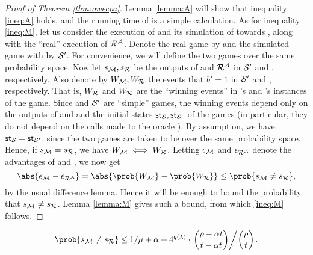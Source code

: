 \begin{proof}[Proof of Theorem \ref{thm:owecpa}]
  Lemma \ref{lemma:A} will show that inequality \eqref{ineq:A} holds,
  and the running time of \redM is a simple calculation.
  As for inequality \eqref{ineq:M}, let us consider the execution of \redM
  and its simulation of \advA towards \redR,
  along with the ``real'' execution of \(\redR^{\advA}\).
  Denote the real game by \Simple and the simulated game with \redM by \(\mathcal{S}'\).
  For convenience, we will define the two games over the same probability space.
  Now let \(s_{\redM}, s_{\redR}\) be the outputs of \redM and \(\redR^{\advA}\) in \(\mathcal{S}'\) and \Simple, respectively.
  Also denote by \(W_{\redM}, W_{\redR}\) the events that \(b' = 1\) in \(\mathcal{S}'\) and \Simple, respectively.
  That is, \(W_{\redR}\) and \(W_{\redR}\) are the ``winning events'' in \redM's and \redR's instances of the game.
  Since \Simple and \(\mathcal{S}'\) are ``simple'' games, the winning events depend only on the outputs of \redM and \redR
  and the initial states \(\mathsf{st}_{\mathcal{S}}, \mathsf{st}_{\mathcal{S}'}\) of the games
  (in particular, they do not depend on the calls made to the oracle \oracle).
  By assumption, we have \(\mathsf{st}_{\mathcal{S}} = \mathsf{st}_{\mathcal{S}'}\),
  since the two games are taken to be over the same probability space.
  Hence, if \(s_{\redM} = s_{\redR}\), we have \(W_{\redM} \iff W_{\redR}\).
  Letting \(\epsilon_{\mathcal{M}}\) and \(\epsilon_{\redR^{\advA}}\) denote the advantages of \redM and \redR, we now get
  \begin{equation}
    \abs{\epsilon_{\redM} - \epsilon_{\redR^{\advA}}} = \abs{\prob{W_{\redM}} - \prob{W_{\redR}}} \le \prob{s_{\redM} \ne s_{\redR}},
  \end{equation}
  by the usual difference lemma.
  Hence it will be enough to bound the probability that \(s_{\redM} \ne s_{\redR}\).
  Lemma \ref{lemma:M} gives such a bound, from which \eqref{ineq:M} follows.
\end{proof}

\begin{lemma}\label{lemma:M}
  \begin{equation}
    \prob{s_{\redM} \ne s_{\redR}}
    \le 1/\mu + \alpha
    + 4^{q(\lambda)} \cdot \left. \binom{\rho - \alpha t}{t - \alpha t} \middle/ \binom{\rho}{t} \right..
  \end{equation}
\end{lemma}

